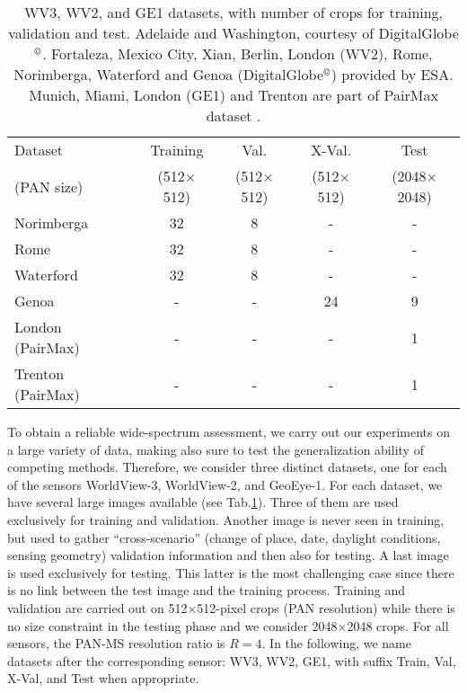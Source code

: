 \documentclass[journal]{IEEEtran}
\begin{document}
\begin{table}
\begin{tabular}{lcccc}
Dataset           &     Training     &        Val.      &       X-Val.     &        Test        \\
(PAN size)        & (512$\times$512) & (512$\times$512) & (512$\times$512) & (2048$\times$2048) \\ \hline
Norimberga        &               32 &                8 &                - &                  - \\
Rome              &               32 &                8 &                - &                  - \\
Waterford         &               32 &                8 &                - &                  - \\
Genoa             &                - &                - &               24 &                  9 \\
London (PairMax)  &                - &                - &                - &                  1 \\
Trenton (PairMax) &                - &                - &                - &                  1 \\ \hline
\end{tabular}
\caption{
WV3, WV2, and GE1 datasets, with number of crops for training, validation and test.
Adelaide and Washington, courtesy of DigitalGlobe$^\copyright$.
Fortaleza, Mexico City, Xian, Berlin, London (WV2), Rome, Norimberga, Waterford and Genoa (DigitalGlobe$^\copyright$) provided by ESA.
Munich, Miami, London (GE1) and Trenton are part of PairMax dataset \cite{Vivone2021}.
}
\label{tab:datasets}
\end{table}

To obtain a reliable wide-spectrum assessment, we carry out our experiments on a large variety of data,
making also sure to test the generalization ability of competing methods.
Therefore, we consider three distinct datasets, one for each of the sensors WorldView-3, WorldView-2, and GeoEye-1.
For each dataset,
we have several large images available (see Tab.\ref{tab:datasets}).
Three of them are used exclusively for training and validation.
Another image is never seen in training, but used to gather ``cross-scenario'' (change of place, date, daylight conditions, sensing geometry)
validation information and then also for testing.
A last image is used exclusively for testing.
This latter is the most challenging case since there is no link between the test image and the training process.
Training and validation are carried out on 512$\times$512-pixel crops (PAN resolution)
while there is no size constraint in the testing phase and we consider 2048$\times$2048 crops.
For all sensors, the PAN-MS resolution ratio is $R=4$.
In the following, we name datasets after the corresponding sensor: WV3, WV2, GE1, with suffix Train, Val, X-Val, and Test when appropriate.
\end{document}

